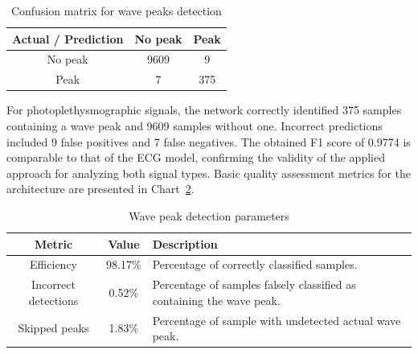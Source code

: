 \documentclass[journal]{IEEEtran}
\begin{document}
\begin{table}[ht]
\centering
\caption{Confusion matrix for wave peaks detection}
\label{tab:conf_matrix_ppg}
\begin{tabular}{|c|c|c|}
\hline
\textbf{Actual / Prediction} & \textbf{No peak } & \textbf{Peak} \\
\hline
No peak  & 9609 & 9 \\

Peak  & 7 & 375 \\
\hline
\end{tabular}
\end{table}

For photoplethysmographic signals, the network correctly identified 375 samples containing a wave peak and 9609 samples without one. Incorrect predictions included 9 false positives and 7 false negatives. The obtained F1 score of 0.9774 is comparable to that of the ECG model, confirming the validity of the applied approach for analyzing both signal types. Basic quality assessment metrics for the architecture are presented in Chart~\ref{tab:metrics_ppg}.

\begin{table}[ht]
\centering
\caption{Wave peak detection parameters}
\label{tab:metrics_ppg}
\begin{tabular}{|c|c|p{4.6cm}|}
\hline
\textbf{Metric} & \textbf{Value} & \textbf{Description} \\
\hline
Efficiency & 98.17\% & Percentage of correctly classified samples. \\
Incorrect detections & 0.52\% & Percentage of samples falsely classified as containing the wave peak. \\
Skipped peaks & 1.83\% & Percentage of sample with undetected actual wave peak. \\
\hline
\end{tabular}
\end{table}
\end{document}
